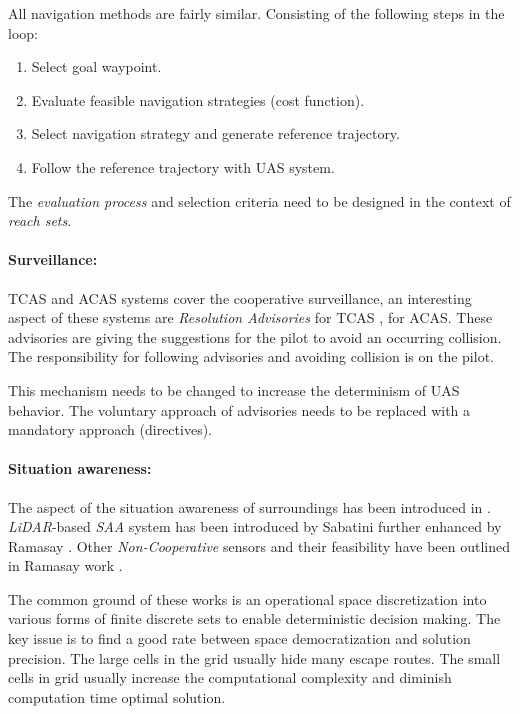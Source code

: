 All navigation methods are fairly similar. Consisting of the following steps in the loop:
\begin{enumerate}
    \item Select goal waypoint.
    \item Evaluate feasible navigation strategies (cost function).
    
    \item Select navigation strategy and generate reference trajectory.
    
    \item Follow the reference trajectory with UAS system.
\end{enumerate}
The \emph{evaluation process} and selection criteria need to be designed in the context of \emph{reach sets}.

\paragraph{Surveillance:} TCAS and ACAS systems cover the cooperative surveillance, an interesting aspect of these systems are \emph{Resolution Advisories} \cite{kennedy1995resolution} for TCAS \cite{marston2015acas}, for ACAS.  These advisories are giving the suggestions for the pilot to avoid an occurring collision. The responsibility for following advisories and avoiding collision is on the pilot.  

This mechanism needs to be changed to increase the determinism of UAS behavior. The voluntary approach of advisories needs to be replaced with a mandatory approach (directives).

\paragraph{Situation awareness:} The aspect of the situation awareness of surroundings has been introduced in \cite{blaskovich2007declutter}. \emph{LiDAR}-based \emph{SAA} system has been introduced by Sabatini \cite{sabatini2014lidar} further enhanced by Ramasay \cite{ramasamy2016lidar}. Other \emph{Non-Cooperative} sensors and their feasibility have been outlined in Ramasay work \cite{ramasamy2014avionics}. 

The common ground of these works is an operational space discretization into various forms of finite discrete sets to enable deterministic decision making. The key issue is to find a good rate between space democratization and solution precision. The large cells in the grid usually hide many escape routes. The small cells in grid usually increase the computational complexity and diminish computation time optimal solution.

